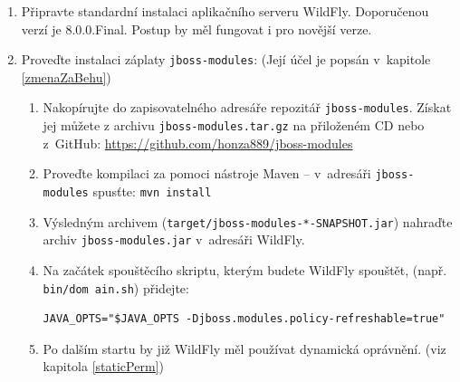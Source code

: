 \begin{enumerate}
  \item Připravte standardní instalaci aplikačního serveru WildFly. Doporučenou verzí je 8.0.0.Final. Postup by měl fungovat i pro novější verze.
  
  \item Proveďte instalaci záplaty {\tt jboss-modules}: (Její účel je popsán v~kapitole \ref{zmenaZaBehu})
  \begin{enumerate}
    \item Nakopírujte do zapisovatelného adresáře repozitář {\tt jboss-modules}. Získat jej můžete z archivu {\tt jboss-modules.tar.gz} na přiloženém CD nebo z~GitHub:
      \newline\url{https://github.com/honza889/jboss-modules}
    \item Proveďte kompilaci za pomoci nástroje Maven -- v~adresáři {\tt jboss-modules} spusťte: {\tt mvn install}
    \item Výsledným archivem ({\tt target/jboss-modules-*-SNAPSHOT.jar}) nahraďte archiv {\tt jboss-modules.jar} v~adresáři WildFly.
    \item Na začátek spouštěcího skriptu, kterým budete WildFly spouštět, (např. {\tt bin/dom ain.sh}) přidejte:
      \begin{lstlisting}
JAVA_OPTS="$JAVA_OPTS -Djboss.modules.policy-refreshable=true"
      \end{lstlisting}
    \item Po dalším startu by již WildFly měl používat dynamická oprávnění. (viz kapitola \ref{staticPerm})
  \end{enumerate}
  

\end{enumerate}
